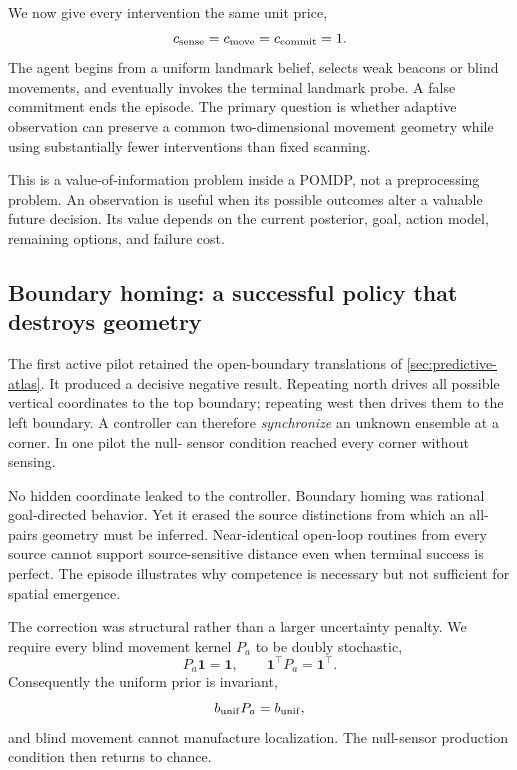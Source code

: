 \documentclass[11pt]{article}
\begin{document}
We now give every intervention the same unit price,
\begin{equation}
 c_{\rm sense}=c_{\rm move}=c_{\rm commit}=1.
 \label{eq:active-unit-cost}
\end{equation}
The agent begins from a uniform landmark belief, selects weak beacons or blind
movements, and eventually invokes the terminal landmark probe. A false
commitment ends the episode. The primary question is whether adaptive
observation can preserve a common two-dimensional movement geometry while
using substantially fewer interventions than fixed scanning.

This is a value-of-information problem inside a POMDP, not a preprocessing
problem. An observation is useful when its possible outcomes alter a valuable
future decision. Its value depends on the current posterior, goal, action
model, remaining options, and failure cost.

\subsection{Boundary homing: a successful policy that destroys geometry}

The first active pilot retained the open-boundary translations of
\cref{sec:predictive-atlas}. It produced a decisive negative result. Repeating
north drives all possible vertical coordinates to the top boundary; repeating
west then drives them to the left boundary. A controller can therefore
\emph{synchronize} an unknown ensemble at a corner. In one pilot the null-
sensor condition reached every corner without sensing.

No hidden coordinate leaked to the controller. Boundary homing was rational
goal-directed behavior. Yet it erased the source distinctions from which an
all-pairs geometry must be inferred. Near-identical open-loop routines from
every source cannot support source-sensitive distance even when terminal
success is perfect. The episode illustrates why competence is necessary but
not sufficient for spatial emergence.

The correction was structural rather than a larger uncertainty penalty. We
require every blind movement kernel $P_a$ to be doubly stochastic,
\begin{equation}
 P_a\mathbf1=\mathbf1,
 \qquad
 \mathbf1^\top P_a=\mathbf1^\top.
 \label{eq:doubly-stochastic}
\end{equation}
Consequently the uniform prior is invariant,
\begin{equation}
 b_{\rm unif}P_a=b_{\rm unif},
 \label{eq:uniform-invariant}
\end{equation}
and blind movement cannot manufacture localization. The null-sensor production
condition then returns to chance.
\end{document}
